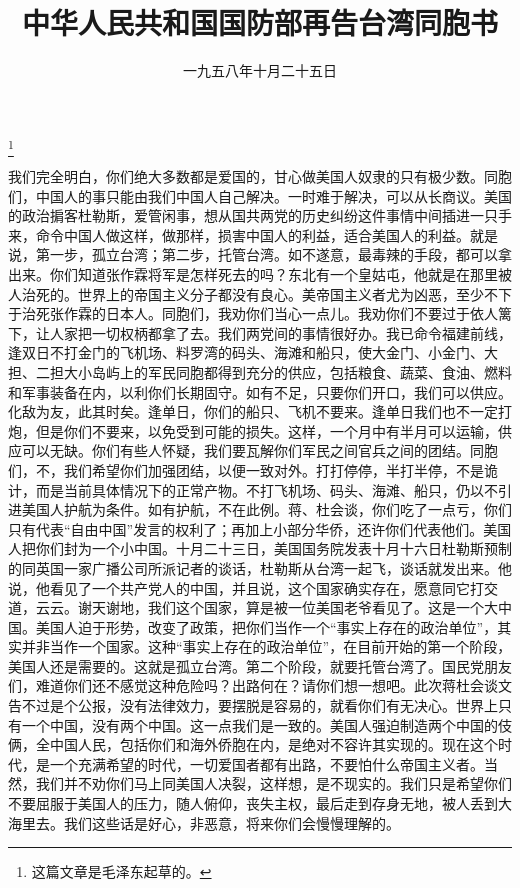 
\title{中华人民共和国国防部再告台湾同胞书}
\date{一九五八年十月二十五日}
\thanks{这篇文章是毛泽东起草的。}
\maketitle



我们完全明白，你们绝大多数都是爱国的，甘心做美国人奴隶的只有极少数。同胞们，中国人的事只能由我们中国人自己解决。一时难于解决，可以从长商议。美国的政治掮客杜勒斯，爱管闲事，想从国共两党的历史纠纷这件事情中间插进一只手来，命令中国人做这样，做那样，损害中国人的利益，适合美国人的利益。就是说，第一步，孤立台湾；第二步，托管台湾。如不遂意，最毒辣的手段，都可以拿出来。你们知道张作霖将军是怎样死去的吗？东北有一个皇姑屯，他就是在那里被人治死的。世界上的帝国主义分子都没有良心。美帝国主义者尤为凶恶，至少不下于治死张作霖的日本人。同胞们，我劝你们当心一点儿。我劝你们不要过于依人篱下，让人家把一切权柄都拿了去。我们两党间的事情很好办。我已命令福建前线，逢双日不打金门的飞机场、料罗湾的码头、海滩和船只，使大金门、小金门、大担、二担大小岛屿上的军民同胞都得到充分的供应，包括粮食、蔬菜、食油、燃料和军事装备在内，以利你们长期固守。如有不足，只要你们开口，我们可以供应。化敌为友，此其时矣。逢单日，你们的船只、飞机不要来。逢单日我们也不一定打炮，但是你们不要来，以免受到可能的损失。这样，一个月中有半月可以运输，供应可以无缺。你们有些人怀疑，我们要瓦解你们军民之间官兵之间的团结。同胞们，不，我们希望你们加强团结，以便一致对外。打打停停，半打半停，不是诡计，而是当前具体情况下的正常产物。不打飞机场、码头、海滩、船只，仍以不引进美国人护航为条件。如有护航，不在此例。蒋、杜会谈，你们吃了一点亏，你们只有代表“自由中国”发言的权利了；再加上小部分华侨，还许你们代表他们。美国人把你们封为一个小中国。十月二十三日，美国国务院发表十月十六日杜勒斯预制的同英国一家广播公司所派记者的谈话，杜勒斯从台湾一起飞，谈话就发出来。他说，他看见了一个共产党人的中国，并且说，这个国家确实存在，愿意同它打交道，云云。谢天谢地，我们这个国家，算是被一位美国老爷看见了。这是一个大中国。美国人迫于形势，改变了政策，把你们当作一个“事实上存在的政治单位”，其实并非当作一个国家。这种“事实上存在的政治单位”，在目前开始的第一个阶段，美国人还是需要的。这就是孤立台湾。第二个阶段，就要托管台湾了。国民党朋友们，难道你们还不感觉这种危险吗？出路何在？请你们想一想吧。此次蒋杜会谈文告不过是个公报，没有法律效力，要摆脱是容易的，就看你们有无决心。世界上只有一个中国，没有两个中国。这一点我们是一致的。美国人强迫制造两个中国的伎俩，全中国人民，包括你们和海外侨胞在内，是绝对不容许其实现的。现在这个时代，是一个充满希望的时代，一切爱国者都有出路，不要怕什么帝国主义者。当然，我们并不劝你们马上同美国人决裂，这样想，是不现实的。我们只是希望你们不要屈服于美国人的压力，随人俯仰，丧失主权，最后走到存身无地，被人丢到大海里去。我们这些话是好心，非恶意，将来你们会慢慢理解的。

